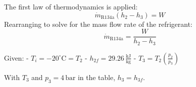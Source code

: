 The first law of thermodynamics is applied:  
\[
\dot{m}_{\text{R134a}} (h_2 - h_3) = W
\]
Rearranging to solve for the mass flow rate of the refrigerant:  
\[
\dot{m}_{\text{R134a}} = \frac{W}{h_2 - h_3}
\]

Given:  
- \(T_i = -20^\circ\text{C} = T_2\)  
- \(h_{2f} = 29.26 \, \frac{\text{kJ}}{\text{kg}}\)  
- \(T_3 = T_2 \left(\frac{p_2}{p_3}\right)\)  

With \(T_3\) and \(p_3 = 4 \, \text{bar}\) in the table, \(h_3 = h_{3f}\).
